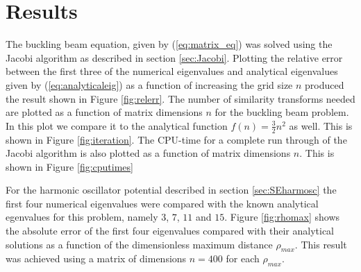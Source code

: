 \documentclass[twocolumn]{aastex62}
\begin{document}
\section{Results} \label{sec:results}
The buckling beam equation, given by (\ref{eq:matrix_eq}) was solved using the Jacobi algorithm as described in section \ref{sec:Jacobi}. Plotting the relative error between the first three of the numerical eigenvalues and analytical eigenvalues given by (\ref{eq:analyticaleig}) as a function of increasing the grid size $n$ produced the result shown in Figure \ref{fig:relerr}. The number of similarity transforms needed are plotted as a function of matrix dimensions $n$ for the buckling beam problem. In this plot we compare it to the analytical function $f(n)=\frac{3}{2}n^2$ as well. This is shown in Figure \ref{fig:iteration}. The CPU-time for a complete run through of the Jacobi algorithm is also plotted as a function of matrix dimensions $n$.  This is shown in Figure \ref{fig:cputimes}\\\indent
\begin{figure*}[h]
	\caption{Figure showing the relative error between the numerical and analytical eigenvalues, given by equation \ref{eq:analyticaleig}, as a function of $n$ for the buckling beam problem given by (\ref{eq:matrix_eq}). Here $n$ starts at $n=3$. }
	\label{fig:relerr}
\end{figure*}
\begin{figure*}[h]
	\caption{Figure showing the number of similarity transforms conducted before the off-diagonal elements are set below a tolerance when solving the buckling beam problem using the Jacobi algorithm.}
	\label{fig:iteration}
\end{figure*}
\begin{figure*}[h]
	\caption{Figure showing the CPU-time as a function of matrix dimension $n$ when solving the buckling beam problem with the jacobi algorithm.}
	\label{fig:cputimes}
\end{figure*}
For the harmonic oscillator potential described in section \ref{sec:SEharmosc} the first four numerical eigenvalues were compared with the known analytical egenvalues for this problem, namely $3$, $7$, $11$ and $15$. Figure \ref{fig:rhomax} shows the absolute error of the first four eigenvalues compared with their analytical solutions as a function of the dimensionless maximum distance $\rho_{max}$. This result was achieved using a matrix of dimensions $n=400$ for each $\rho_{max}$.\\\indent
\end{document}
